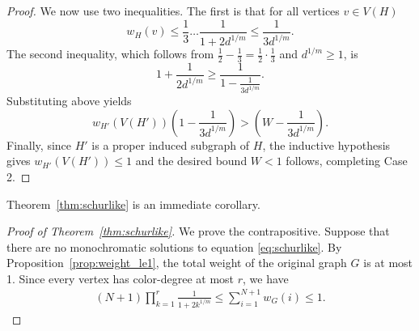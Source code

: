 \documentclass[10pt,a4paper]{amsart}
\begin{document}
\begin{proof}
 We now use two inequalities. The first is that for all vertices $v \in V(H)$
 \[
w_H(v) \leq \frac{1}{3} \dots \frac{1}{1+2 d^{1/m}} \leq \frac{1}{3 d^{1/m}}.
 \]
The second inequality, which follows from $\tfrac{1}{2}-\tfrac{1}{3} = \tfrac{1}{2} \cdot \tfrac{1}{3}$ and $d^{1/m} \ge 1$, is
\[
1+ \frac{1}{2 d^{1/m}} \geq \frac{1}{1-\frac{1}{3d^{1/m}}}.
\]
Substituting above yields
\[
w_{H'}(V(H')) \left(1-\frac{1}{3d^{1/m}}\right) > \left( W - \frac{1}{3 d^{1/m}}\right).
\]
Finally, since \(H'\) is a proper induced subgraph of \(H\), the inductive hypothesis gives \(w_{H'}(V(H')) \leq 1\) and the desired bound \(W<1\) follows, completing Case 2.


\end{proof}

Theorem~\ref{thm:schurlike} is an immediate corollary.


\begin{proof}[Proof of Theorem~\ref{thm:schurlike}]
We prove the contrapositive. Suppose that there are no monochromatic solutions to equation \eqref{eq:schurlike}. By Proposition~\ref{prop:weight_le1}, the total weight of the original graph $G$ is at most 1. Since every vertex has color-degree at most $r$, we have
\begin{align*}
    (N+1) \prod_{k=1}^r \frac{1}{1 + 2 k^{1/m}} \leq \sum_{i=1}^{N+1} w_G(i) \leq 1.
\end{align*}
\end{proof}
\end{document}
